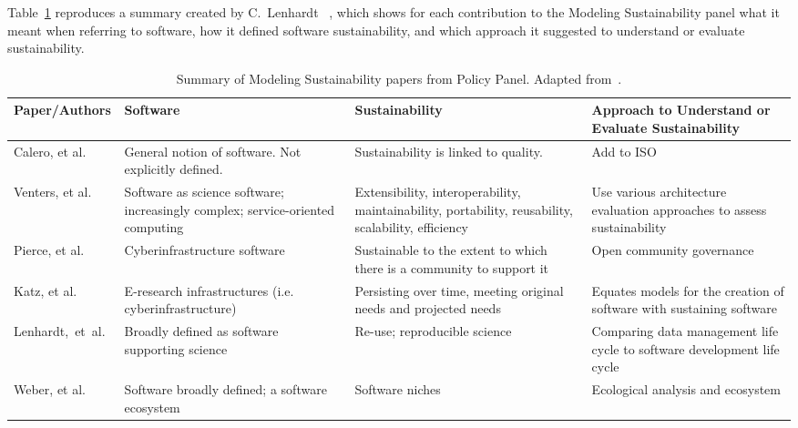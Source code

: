 \documentclass[11pt, oneside]{amsart}
\begin{document}
Table~\ref{tab:defining-sustainability} reproduces a summary created
by C.~Lenhardt ~\cite{lenhardt-wssspe1-panel}, which shows for each
contribution to the Modeling Sustainability panel what it meant when
referring to software, how it defined software sustainability, and
which approach it suggested to understand or evaluate sustainability.
\begin{table}[t]
  \begin{scriptsize}
    \begin{center}
      \caption{Summary of Modeling Sustainability papers from Policy Panel.  Adapted from~\cite{lenhardt-wssspe1-panel}.}
      \label{tab:defining-sustainability}
      \begin{tabular}{|p{2.3cm}|p{3.6cm}|p{4.4cm}|p{4.8cm}|}
                \hline
{\bf Paper/Authors}
& {\bf Software}
& {\bf Sustainability}
& {\bf Approach to Understand or Evaluate Sustainability} \\
                \hline
Calero, et al.~\cite{Calero_WSSSPE}
& General notion of software. Not explicitly defined.
& Sustainability is linked to quality.
& Add to ISO \\
                \hline
Venters, et al.~\cite{Venters_WSSSPE}
& Software as science software; increasingly complex; service-oriented computing
& Extensibility, interoperability, maintainability, portability, reusability, scalability, efficiency
& Use various architecture evaluation approaches to assess sustainability \\
                \hline
Pierce, et al.~\cite{Pierce_WSSSPE}
& Cyberinfrastructure software
& Sustainable to the extent to which there is a community to support it
& Open community governance \\
                \hline
Katz, et al.~\cite{Katz_WSSSPE}
& E-research infrastructures (i.e. cyberinfrastructure)
& Persisting over time, meeting original needs and projected needs
& Equates models for the creation of software with sustaining software \\
                \hline
Lenhardt,~et~al.~\cite{Lenhardt_WSSSPE}
& Broadly defined as software supporting science
& Re-use; reproducible science
& Comparing data management life cycle to software development life cycle \\
                \hline
Weber, et al.~\cite{Weber_WSSSPE}
& Software broadly defined; a software ecosystem
& Software niches
& Ecological analysis and ecosystem \\
                \hline
     \end{tabular}
    \end{center}
  \end{scriptsize}
\end{table}
\end{document}
